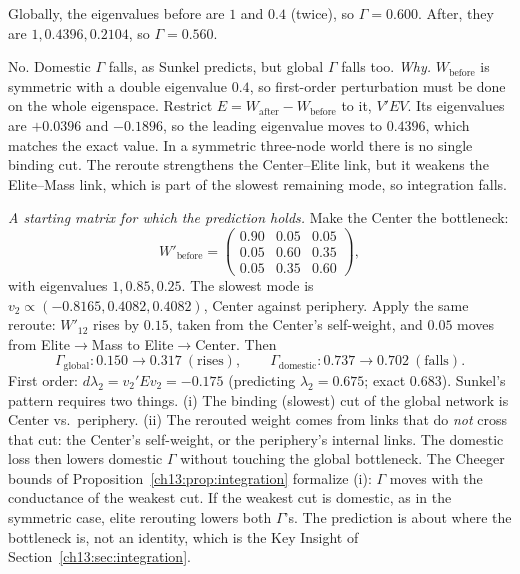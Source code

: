 \documentclass[../solutions_manual.tex]{subfiles}
\begin{document}
 Globally, the eigenvalues before are $1$ and $0.4$ (twice), so $\Gamma = 0.600$. After, they are $1, 0.4396, 0.2104$, so $\Gamma = 0.560$.

 No. Domestic $\Gamma$ falls, as Sunkel predicts, but global $\Gamma$ falls too. \emph{Why.} $W_{\text{before}}$ is symmetric with a double eigenvalue $0.4$, so first-order perturbation must be done on the whole eigenspace. Restrict $E = W_{\text{after}} - W_{\text{before}}$ to it, $V'EV$. Its eigenvalues are $+0.0396$ and $-0.1896$, so the leading eigenvalue moves to $0.4396$, which matches the exact value. In a symmetric three-node world there is no single binding cut. The reroute strengthens the Center--Elite link, but it weakens the Elite--Mass link, which is part of the slowest remaining mode, so integration falls.

\emph{A starting matrix for which the prediction holds.} Make the Center the bottleneck:
\[
W'_{\text{before}} = \begin{pmatrix} 0.90 & 0.05 & 0.05 \\ 0.05 & 0.60 & 0.35 \\ 0.05 & 0.35 & 0.60 \end{pmatrix},
\]
with eigenvalues $1, 0.85, 0.25$. The slowest mode is $v_2 \propto (-0.8165, 0.4082, 0.4082)$, Center against periphery. Apply the same reroute: $W'_{12}$ rises by $0.15$, taken from the Center's self-weight, and $0.05$ moves from Elite$\to$Mass to Elite$\to$Center. Then
\[
\Gamma_{\text{global}}: 0.150 \to 0.317 \ (\text{rises}), \qquad \Gamma_{\text{domestic}}: 0.737 \to 0.702 \ (\text{falls}).
\]
First order: $d\lambda_2 = v_2'Ev_2 = -0.175$ (predicting $\lambda_2 = 0.675$; exact $0.683$). Sunkel's pattern requires two things. (i) The binding (slowest) cut of the global network is Center vs.\ periphery. (ii) The rerouted weight comes from links that do \emph{not} cross that cut: the Center's self-weight, or the periphery's internal links. The domestic loss then lowers domestic $\Gamma$ without touching the global bottleneck. The Cheeger bounds of Proposition~\ref{ch13:prop:integration} formalize (i): $\Gamma$ moves with the conductance of the weakest cut. If the weakest cut is domestic, as in the symmetric case, elite rerouting lowers both $\Gamma$'s. The prediction is about where the bottleneck is, not an identity, which is the Key Insight of Section~\ref{ch13:sec:integration}.
\end{document}
